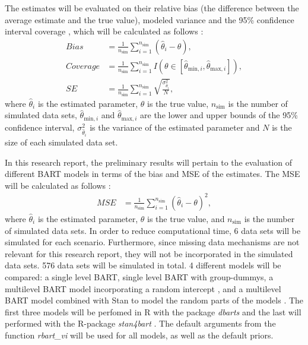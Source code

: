 \documentclass[10pt, a4paper, titlepage]{article}
\begin{document}
The estimates will be evaluated on their relative bias (the difference between the average estimate and the true value), modeled variance and the 95\% confidence interval coverage \citep{oberman2023}, which will be calculated as follows \citep{morris2019}:
\begin{subequations}
\label{eq:evaluations}
\begin{align}
Bias &= \frac{1}{n_{\text{sim}}} \sum_{i=1}^{n_{\text{sim}}} (\hat{\theta}_i - \theta), \tag{5} \\
Coverage &= \frac{1}{n_{\text{sim}}} \sum_{i=1}^{n_{\text{sim}}} I({\theta} \in [\hat{\theta}_{\text{min},i}, \hat{\theta}_{\text{max},i}]), \tag{6} \\
SE &= \frac{1}{n_{\text{sim}}} \sum_{i=1}^{n_{\text{sim}}} \sqrt{\frac{\sigma^2_{\hat{\theta}_i}}{N}}, \tag{7}
\end{align}
\end{subequations}
where $\hat{\theta}_i$ is the estimated parameter, $\theta$ is the true value, $n_{\text{sim}}$ is the number of simulated data sets, $\hat{\theta}_{\text{min},i}$ and $\hat{\theta}_{\text{max},i}$ are the lower and upper bounds of the 95\% confidence interval, $\sigma^2_{\hat{\theta}_i}$ is the variance of the estimated parameter and $N$ is the size of each simulated data set.

In this research report, the preliminary results will pertain to the evaluation of different BART models in terms of the bias and MSE of the estimates. The MSE will be calculated as follows \citep{morris2019}:
\begin{subequations}
\label{eq:MSE}
\begin{align}
MSE &= \frac{1}{n_{\text{sim}}} \sum_{i=1}^{n_{\text{sim}}} (\hat{\theta}_i - \theta)^{2}, \tag{8}
\end{align}
\end{subequations}
where $\hat{\theta}_i$ is the estimated parameter, $\theta$ is the true value, and $n_{\text{sim}}$ is the number of simulated data sets. In order to reduce computational time, 6 data sets will be simulated for each scenario. Furthermore, since missing data mechanisms are not relevant for this research report, they will not be incorporated in the simulated data sets. 576 data sets will be simulated in total.
4 different models will be compared: a single level BART, single level BART with group-dummys, a multilevel BART model incorporating a random intercept \citep{chen2020, wagner2020, tan2016, wundervald2022}, and a multilevel BART model combined with Stan to model the random parts of the models \citep{dorie2022}. The first three models will be perfomed in R \citep{rcoreteam2023} with the package \textit{dbarts} \citep{dorie2023} and the last will performed with the R-package \textit{stan4bart} \citep{dorie2023a}. The default arguments from the function \textit{rbart\_vi} will be used for all models, as well as the default priors.
\end{document}

